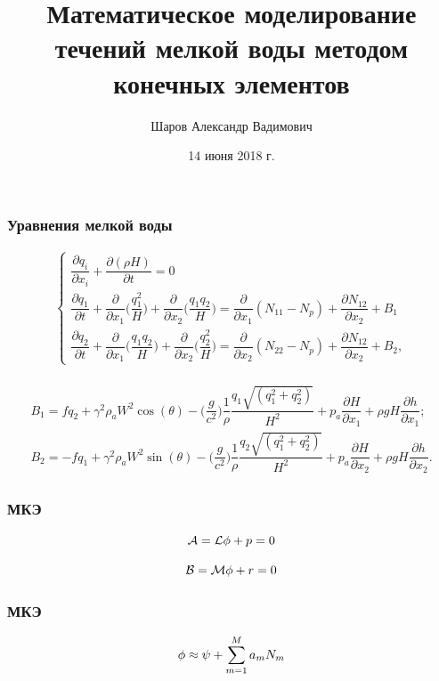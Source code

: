 \documentclass[10pt,utf8,presentation,compress]{beamer}
\title[Мат. моделирование течений мелкой воды с помощью МКЭ]{Математическое моделирование течений мелкой воды методом конечных элементов}
\author[Шаров Александр Вадимович]{Шаров Александр Вадимович}
\institute[НИУ СГУ имени Н.Г.Чернышевского]{Саратовский национальный исследовательский \\ государственный университет \\ им. Н.Г.Чернышевского}
\date{14 июня 2018 г.}
\begin{document}
\frame[plain]{\titlepage}

\begin{frame}
\frametitle{Уравнения мелкой воды}
	\begin{eqnarray*}
	\begin{cases}
		\dfrac{ \partial q_i}{\partial x_i} + \dfrac{\partial(\rho H)}{\partial t} = 0 \\
		\dfrac{\partial q_1}{\partial t} + \dfrac{\partial}{\partial x_1} \bigg(\dfrac{q_1^2}{H}\bigg)+\dfrac{\partial }{\partial x_2}\bigg(\dfrac{q_1 q_2}{H}\bigg) = \dfrac{\partial}{\partial x_1} (N_{11}-N_p) + \dfrac{\partial N_{12}}{\partial x_2} + B_1 \\
		\dfrac{\partial q_2}{\partial t} + \dfrac{\partial}{\partial x_1} \bigg(\dfrac{q_1 q_2}{H}\bigg)+\dfrac{\partial }{\partial x_2}\bigg(\dfrac{q_2^2}{H}\bigg) = \dfrac{\partial}{\partial x_2} (N_{22}-N_p) + \dfrac{\partial N_{12}}{\partial x_2} + B_2,
	\end{cases}
	\end{eqnarray*}

	\begin{eqnarray*}
	\begin{aligned}
		B_1=fq_2+\gamma^2\rho_aW^2\cos(\theta)-\bigg(\dfrac{g}{c^2}\bigg)\dfrac{1}{\rho}\dfrac{q_1\sqrt{(q_1^2+q_2^2)}}{H^2} + p_a \dfrac{\partial H}{\partial x_1} + \rho gH\dfrac{\partial h}{\partial x_1}; \\
		B_2=-fq_1+\gamma^2\rho_aW^2\sin(\theta)-\bigg(\dfrac{g}{c^2}\bigg)\dfrac{1}{\rho}\dfrac{q_2\sqrt{(q_1^2+q_2^2)}}{H^2} + p_a \dfrac{\partial H}{\partial x_2} + \rho gH\dfrac{\partial h}{\partial x_2}.
	\end{aligned}
	\end{eqnarray*}
\end{frame}


\begin{frame}
\frametitle{МКЭ}
	\begin{equation}\label{eq:1}
		\Large\mathcal A = \mathcal L\phi + p = 0
	\end{equation}

	\begin{equation}\label{eq:2}
		\Large\mathcal B = \mathcal M \phi+r=0
	\end{equation}
\end{frame}

\begin{frame}
\frametitle{МКЭ}
	\begin{equation}\label{eq:3}
		\Large\phi \approx \psi + \sum\limits_{m=1}^{M} a_mN_m
	\end{equation}
\end{frame}
\end{document}
